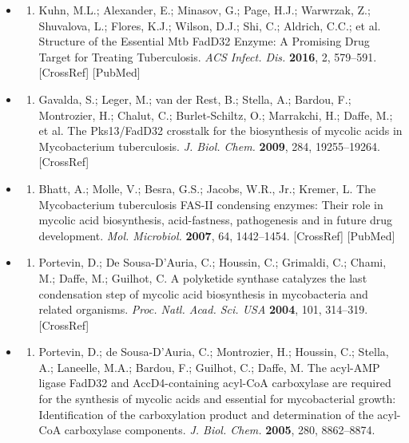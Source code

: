 \documentclass{article}
\begin{document}
\begin{itemize}
\begin{enumerate}
\end{enumerate}

\item \begin{enumerate}
\item 
Kuhn, M.L.; Alexander, E.; Minasov, G.; Page, H.J.; Warwrzak, Z.; Shuvalova, L.; Flores, K.J.; Wilson, D.J.; Shi, C.; Aldrich, C.C.; et al. Structure of the Essential Mtb FadD32 Enzyme: A Promising Drug Target for Treating Tuberculosis. \textit{ACS Infect. Dis.} \textbf{2016}, 2, 579–591. [CrossRef] [PubMed]

\end{enumerate}

\item \begin{enumerate}
\item 
Gavalda, S.; Leger, M.; van der Rest, B.; Stella, A.; Bardou, F.; Montrozier, H.; Chalut, C.; Burlet-Schiltz, O.; Marrakchi, H.; Daffe, M.; et al. The Pks13/FadD32 crosstalk for the biosynthesis of mycolic acids in Mycobacterium tuberculosis. \textit{J. Biol. Chem.} \textbf{2009}, 284, 19255–19264. [CrossRef]

\end{enumerate}

\item \begin{enumerate}
\item 
Bhatt, A.; Molle, V.; Besra, G.S.; Jacobs, W.R., Jr.; Kremer, L. The Mycobacterium tuberculosis FAS-II condensing enzymes: Their role in mycolic acid biosynthesis, acid-fastness, pathogenesis and in future drug development. \textit{Mol. Microbiol.} \textbf{2007}, 64, 1442–1454. [CrossRef] [PubMed]

\end{enumerate}

\item \begin{enumerate}
\item 
Portevin, D.; De Sousa-D'Auria, C.; Houssin, C.; Grimaldi, C.; Chami, M.; Daffe, M.; Guilhot, C. A polyketide synthase catalyzes the last condensation step of mycolic acid biosynthesis in mycobacteria and related organisms. \textit{Proc. Natl. Acad. Sci. USA} \textbf{2004}, 101, 314–319. [CrossRef]

\end{enumerate}

\item \begin{enumerate}
\item 
Portevin, D.; de Sousa-D'Auria, C.; Montrozier, H.; Houssin, C.; Stella, A.; Laneelle, M.A.; Bardou, F.; Guilhot, C.; Daffe, M. The acyl-AMP ligase FadD32 and AccD4-containing acyl-CoA carboxylase are required for the synthesis of mycolic acids and essential for mycobacterial growth: Identification of the carboxylation product and determination of the acyl-CoA carboxylase components. \textit{J. Biol. Chem.} \textbf{2005}, 280, 8862–8874.


\end{enumerate}
\end{itemize}
\end{document}
